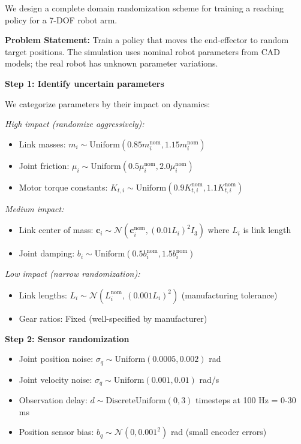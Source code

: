 \begin{example}
\label{ex:complete_domain_rand}
We design a complete domain randomization scheme for training a reaching policy for a 7-DOF robot arm.

\textbf{Problem Statement:}
Train a policy that moves the end-effector to random target positions. The simulation uses nominal robot parameters from CAD models; the real robot has unknown parameter variations.

\textbf{Step 1: Identify uncertain parameters}

We categorize parameters by their impact on dynamics:

\textit{High impact (randomize aggressively):}
\begin{itemize}
    \item Link masses: $m_i \sim \text{Uniform}(0.85 m_i^{\text{nom}}, 1.15 m_i^{\text{nom}})$
    \item Joint friction: $\mu_i \sim \text{Uniform}(0.5\mu_i^{\text{nom}}, 2.0\mu_i^{\text{nom}})$
    \item Motor torque constants: $K_{t,i} \sim \text{Uniform}(0.9 K_{t,i}^{\text{nom}}, 1.1 K_{t,i}^{\text{nom}})$
\end{itemize}

\textit{Medium impact:}
\begin{itemize}
    \item Link center of mass: $\mathbf{c}_i \sim \mathcal{N}(\mathbf{c}_i^{\text{nom}}, (0.01 L_i)^2 I_3)$ where $L_i$ is link length
    \item Joint damping: $b_i \sim \text{Uniform}(0.5 b_i^{\text{nom}}, 1.5 b_i^{\text{nom}})$
\end{itemize}

\textit{Low impact (narrow randomization):}
\begin{itemize}
    \item Link lengths: $L_i \sim \mathcal{N}(L_i^{\text{nom}}, (0.001 L_i)^2)$ (manufacturing tolerance)
    \item Gear ratios: Fixed (well-specified by manufacturer)
\end{itemize}

\textbf{Step 2: Sensor randomization}

\begin{itemize}
    \item Joint position noise: $\sigma_q \sim \text{Uniform}(0.0005, 0.002)$ rad
    \item Joint velocity noise: $\sigma_{\dot{q}} \sim \text{Uniform}(0.001, 0.01)$ rad/s
    \item Observation delay: $d \sim \text{DiscreteUniform}(0, 3)$ timesteps at 100 Hz = 0-30 ms
    \item Position sensor bias: $b_q \sim \mathcal{N}(0, 0.001^2)$ rad (small encoder errors)
\end{itemize}


\end{example}
